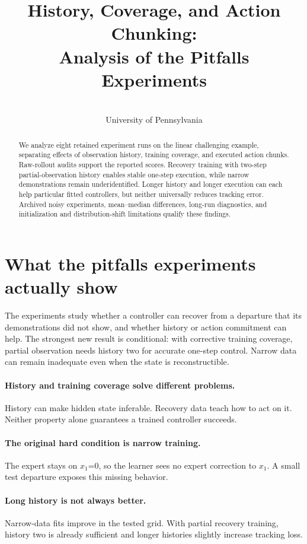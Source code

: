 \documentclass{l4dc2026}
\title[Pitfalls Experiment Analysis]{History, Coverage, and Action Chunking:\\Analysis of the Pitfalls Experiments}
\author{\Name{Nihar Ballamudi}\and\Name{Kyle Horton}\\\addr University of Pennsylvania}
\begin{document}
\maketitle
\begin{abstract}
We analyze eight retained experiment runs on the linear challenging example, separating effects of observation history, training coverage, and executed action chunks. Raw-rollout audits support the reported scores. Recovery training with two-step partial-observation history enables stable one-step execution, while narrow demonstrations remain underidentified. Longer history and longer execution can each help particular fitted controllers, but neither universally reduces tracking error. Archived noisy experiments, mean--median differences, long-run diagnostics, and initialization and distribution-shift limitations qualify these findings.
\end{abstract}
\section{What the pitfalls experiments actually show}
The experiments study whether a controller can recover from a departure that its demonstrations did not show, and whether history or action commitment can help. The strongest new result is conditional: with corrective training coverage, partial observation needs history two for accurate one-step control. Narrow data can remain inadequate even when the state is reconstructible.

\paragraph{History and training coverage solve different problems.}
History can make hidden state inferable. Recovery data teach how to act on it. Neither property alone guarantees a trained controller succeeds.

\paragraph{The original hard condition is narrow training.}
The expert stays on $x_1$=0, so the learner sees no expert correction to $x_1$. A small test departure exposes this missing behavior.

\paragraph{Long history is not always better.}
Narrow-data fits improve in the tested grid. With partial recovery training, history two is already sufficient and longer histories slightly increase tracking loss.
\end{document}
